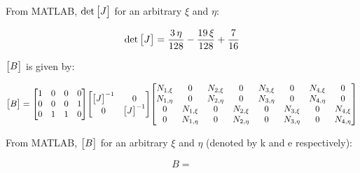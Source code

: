\documentclass[../main.tex]{subfiles}
\begin{document}
From MATLAB, \(\det\mqty[J]\) for an arbitrary \(\xi\) and \(\eta\):

\[
    \det \mqty[J] =
    \frac{3\,\eta}{128}-\frac{19\,\xi}{128}+\frac{7}{16}  
\]

\(\mqty[B]\) is given by:

\[
    \mqty[B]
    =
    \mqty[
        1 & 0 & 0 & 0\\
        0 & 0 & 0 & 1\\
        0 & 1 & 1 & 0]
    \mqty[
        \mqty[J]^{-1} & 0\\
        0 & \mqty[J]^{-1} 
    ]
    \mqty[
        N_{1,\xi} & 0 & N_{2,\xi} & 0 & N_{3,\xi} & 0 & N_{4,\xi} & 0\\
        N_{1,\eta} & 0 & N_{2,\eta} & 0 & N_{3,\eta} & 0 & N_{4,\eta} & 0\\
        0 & N_{1,\xi} & 0 & N_{2,\xi} & 0 & N_{3,\xi} & 0 & N_{4,\xi}\\
        0 & N_{1,\eta} & 0 & N_{2,\eta} & 0 & N_{3,\eta} & 0 & N_{4,\eta} 
    ]
\]

From MATLAB, \(\mqty[B]\) for an arbitrary \(\xi\) and \(\eta\) (denoted by k and e respectively):

\[
    B =  
\]
\end{document}

